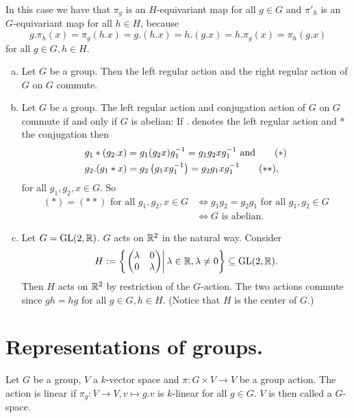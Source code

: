 \begin{rem}
 In this case we have that $\pi_g$ is an $H$-equivariant map for all $g \in G$ and $\pi'_h$ is an $G$-equivariant map for all $h \in H$, because
 \[
  g.\pi_h(x) = \pi_g(h.x) = g.(h.x) = h.(g.x) = h.\pi_g(x) = \pi_h(g.x)
 \]
 for all $g \in G, h \in H$.
\end{rem}


\begin{expls}
 \begin{enumerate}[a)]
  \item
   Let $G$ be a group. Then the left regular action and the right regular action of $G$ on $G$ commute.
  \item
   Let $G$ be a group. The left regular action and conjugation action of $G$ on $G$ commute if and only if $G$ is abelian: If $.$ denotes the left regular action and $*$ the conjugation then
   \begin{align*}
    g_1*(g_2.x) &= g_1 (g_2 x) g_1^{-1} = g_1 g_2 x g_1^{-1} \text{ and} \tag{\ensuremath{\ast}}\\
    g_2.(g_1*x) &= g_2 \left(g_1 x g_1^{-1}\right) = g_2 g_1 x g_1^{-1} \tag{\ensuremath{\ast\ast}},
   \end{align*}
   for all $g_1, g_2, x \in G$. So
   \begin{align*}
    (\ast) = (\ast\ast) \text{ for all } g_1, g_2, x \in G
    &\Leftrightarrow g_1 g_2 = g_2 g_1 \text{ for all } g_1, g_2 \in G \\
    &\Leftrightarrow \text{$G$ is abelian}.
   \end{align*}
  \item
   Let $G = \operatorname{GL}(2,\mathbb{R})$. $G$ acts on $\mathbb{R}^2$ in the natural way. Consider
   \[
    H := \left\{ \left. \begin{pmatrix}\lambda&0\\0&\lambda\end{pmatrix} \right| \lambda \in \mathbb{R}, \lambda \neq 0 \right\} \subseteq \operatorname{GL}(2,\mathbb{R}).
   \]
   Then $H$ acts on $\mathbb{R}^2$ by restriction of the $G$-action. The two actions commute since $gh = hg$ for all $g \in G, h \in H$. (Notice that $H$ is the center of $G$.)
 \end{enumerate}
\end{expls}


\section{Representations of groups.}


\begin{defi}
 Let $G$ be a group, $V$ a $k$-vector space and $\pi : G \times V \to V$ be a group action. The action is linear if $\pi_g : V \to V, v \mapsto g.v$ is $k$-linear for all $g \in G$. $V$ is then called a $G$-space.
\end{defi}


